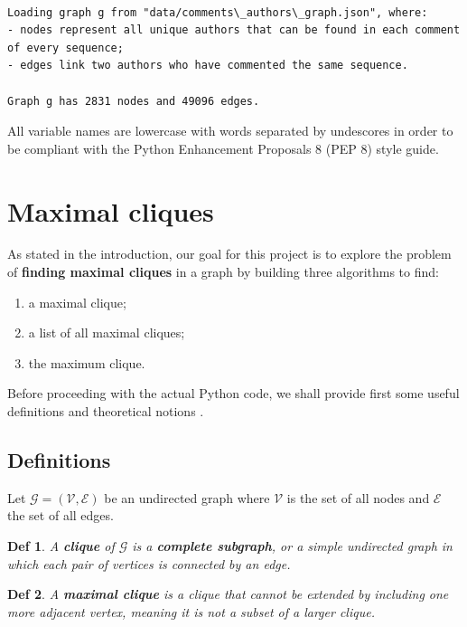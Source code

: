 \documentclass[11pt]{article}
\newtheorem*{definition}{Def}
\begin{document}
    \begin{Verbatim}[commandchars=\\\{\}]

Loading graph g from "data/comments\_authors\_graph.json", where:
- nodes represent all unique authors that can be found in each comment of every sequence;
- edges link two authors who have commented the same sequence.

Graph g has 2831 nodes and 49096 edges.
    \end{Verbatim}

    All variable names are lowercase with words separated by undescores in
order to be compliant with the Python Enhancement Proposals 8 (PEP 8)
style
guide\cite{pep_style}.

\section{Maximal cliques}\label{maximal-cliques}

As stated in the introduction, our goal for this project is to explore
the problem of \textbf{finding maximal cliques} in a graph by building
three algorithms to find:

\begin{enumerate}
    \item a maximal clique; \item a list of all maximal
cliques; \item the maximum clique.
\end{enumerate}

Before proceeding with the actual Python code, we shall provide first
some useful definitions and theoretical notions .

\hypertarget{definitions}{%
\subsection{Definitions}\label{definitions}}

Let \(\mathcal{G} = (\mathcal{V}, \mathcal{E})\) be an undirected graph
where \(\mathcal{V}\) is the set of all nodes and \(\mathcal{E}\) the
set of all edges.

\begin{definition}
A \textbf{clique} of \(\mathcal{G}\) is a \textbf{complete subgraph}, or
a simple undirected graph in which each pair of vertices is connected by
an
edge\cite{clique}\cite{complete_graph}.
\end{definition}

\begin{definition}
A \textbf{maximal clique} is a clique that cannot be extended by
including one more adjacent vertex, meaning it is not a subset of a
larger clique.
\end{definition}
\end{document}
